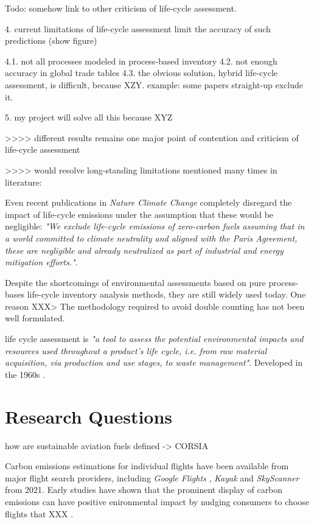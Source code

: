\documentclass{article}
\begin{document}
    Todo: somehow link to other criticism of life-cycle assessment. 
    
    4. current limitations of life-cycle assessment limit the accuracy of such predictions (show figure)
    
        4.1. not all processes modeled in process-based inventory
        4.2. not enough accuracy in global trade tables
        4.3. the obvious solution, hybrid life-cycle assessment, is difficult, because XZY. example: some papers straight-up exclude it.
        
    5. my project will solve all this because XYZ
    
    >>>> different results remains one major point of contention and criticism of life-cycle assessment \cite{reap_survey_2008}\cite{reap_survey_2008-1}
    
    >>>> would resolve long-standing limitations mentioned many times in literature: \cite{finnveden_limitations_2000}\cite{plevin_using_2014}

Even recent publications in \textit{Nature Climate Change} completely disregard the impact of life-cycle emissions under the assumption that these would be negligible: \textit{"We exclude life-cycle emissions of zero-carbon fuels assuming that in a world committed to climate neutrality and aligned with the Paris Agreement, these are negligible and already neutralized as part of industrial and energy mitigation efforts."}\cite{brazzola_definitions_2022}.

Despite the shortcomings of environmental assessments based on pure process-bases life-cycle inventory analysis methods, they are still widely used today. One reason XXX> The methodology required to avoid double counting has not been well formulated. 

    life cycle assessment is \textit{"a tool to assess the potential environmental impacts and resources used throughout a product’s life cycle, i.e. from raw material acquisition, via production and use stages, to waste management"}\cite{noauthor_iso_2006}. Developed in the 1960s \cite{hauschild_life_2018}. 
    
\section{Research Questions}
    
    how are sustainable aviation fuels defined -> CORSIA \cite{prussi_corsia_2021}

    Carbon emissions estimations for individual flights have been available from major flight search providers, including \textit{Google Flights} \cite{holden_google_2021}, \textit{Kayak} \cite{noauthor_kayak_2021} and \textit{SkyScanner} \cite{crosthwaite_how_2021} from 2021. Early studies have shown that the prominent display of carbon emissions can have positive enironmental impact by nudging consumers to choose flights that XXX \cite{amenta_adding_2020}\cite{sanguinetti_nudging_2022}.
    
\end{document}
